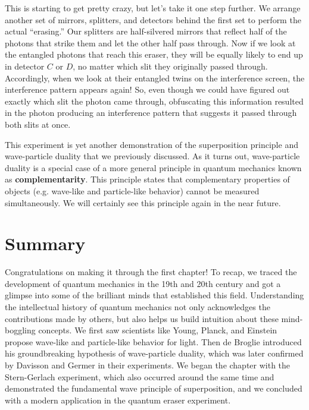 This is starting to get pretty crazy, but let's take it one step further. We arrange another set of mirrors, splitters, and detectors behind the first set to perform the actual ``erasing.'' Our splitters are half-silvered mirrors that reflect half of the photons that strike them and let the other half pass through. Now if we look at the entangled photons that reach this eraser, they will be equally likely to end up in detector $C$ or $D$, no matter which slit they originally passed through. Accordingly, when we look at their entangled twins on the interference screen, the interference pattern appears again! So, even though we could have figured out exactly which slit the photon came through, obfuscating this information resulted in the photon producing an interference pattern that suggests it passed through both slits at once. \par

This experiment is yet another demonstration of the superposition principle and wave-particle duality that we previously discussed. As it turns out, wave-particle duality is a special case of a more general principle in quantum mechanics known as \textbf{complementarity}. This principle states that complementary properties of objects (e.g. wave-like and particle-like behavior) cannot be measured simultaneously. We will certainly see this principle again in the near future.


\section{Summary}
Congratulations on making it through the first chapter! To recap, we traced the development of quantum mechanics in the 19th and 20th century and got a glimpse into some of the brilliant minds that established this field. Understanding the intellectual history of quantum mechanics not only acknowledges the contributions made by others, but also helps us build intuition about these mind-boggling concepts. We first saw scientists like Young, Planck, and Einstein propose wave-like and particle-like behavior for light. Then de Broglie introduced his groundbreaking hypothesis of wave-particle duality, which was later confirmed by Davisson and Germer in their experiments. We began the chapter with the Stern-Gerlach experiment, which also occurred around the same time and demonstrated the fundamental wave principle of superposition, and we concluded with a modern application in the quantum eraser experiment. \par

